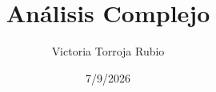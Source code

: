 \documentclass{report}
\begin{document}
\title{Análisis Complejo}
\author{Victoria Torroja Rubio}
\date{7/9/2026}

\maketitle

\tableofcontents

\pagebreak






\end{document}
